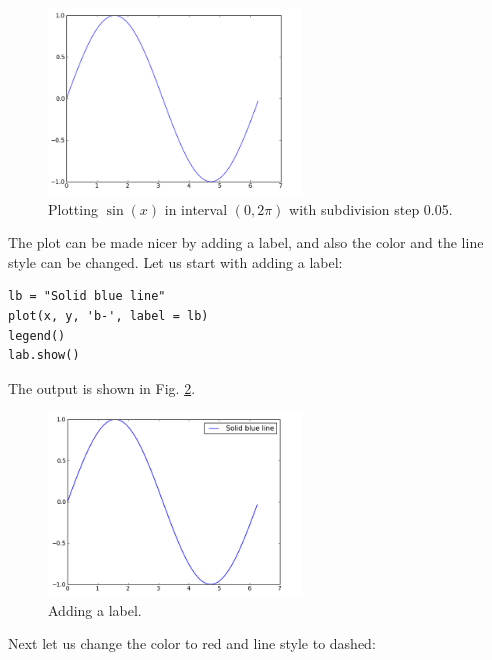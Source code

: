 \documentclass[article,A4,12pt]{llncs}
\begin{document}
\begin{figure}[!ht]
\begin{center}
\includegraphics[width=0.6\textwidth]{img/plot1.png}
\end{center}
\vspace{-6mm}
\caption{Plotting $\sin(x)$ in interval $(0, 2\pi)$ with subdivision step 0.05.}
\label{fig:plot1}
\vspace{-2mm}
\end{figure}
\noindent
The plot can be made nicer by adding a label, and also the color 
and the line style can be changed. Let us start with adding a label:

\begin{verbatim}
lb = "Solid blue line"
plot(x, y, 'b-', label = lb)
legend()
lab.show()
\end{verbatim}
The output is shown in Fig. \ref{fig:plot2}.

\begin{figure}[!ht]
\begin{center}
\includegraphics[width=0.6\textwidth]{img/plot2.png}
\end{center}
\vspace{-6mm}
\caption{Adding a label.}
\label{fig:plot2}
\vspace{-1cm}
\end{figure}
\newpage

\noindent
Next let us change the color to red and line style to dashed: 
\end{document}

